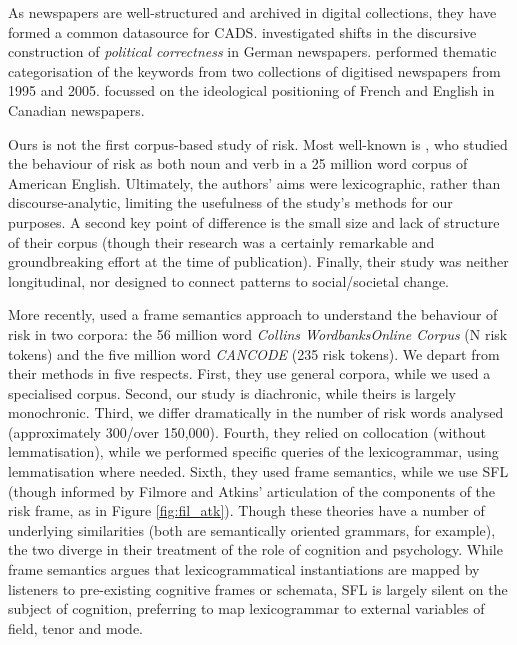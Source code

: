 \noindent As newspapers are well-structured and archived in digital collections, they have formed a common datasource for CADS.  investigated shifts in the discursive construction of \emph{political correctness} in German newspapers.  performed thematic categorisation of the keywords from two collections of digitised newspapers from 1995 and 2005.  focussed on the ideological positioning of French and English in Canadian newspapers. %

Ours is not the first corpus-based study of risk. Most well-known is , who studied the behaviour of risk as both noun and verb in a 25 million word corpus of American English. Ultimately, the authors' aims were lexicographic, rather than discourse-analytic, limiting the usefulness of the study's methods for our purposes. A second key point of difference is the small size and lack of structure of their corpus (though their research was a certainly remarkable and groundbreaking effort at the time of publication). Finally, their study was neither longitudinal, nor designed to connect patterns to social/societal change.

More recently,  used a frame semantics approach to understand the behaviour of risk in two corpora: the 56 million word \emph{Collins WordbanksOnline Corpus} (N risk tokens) and the five million word \emph{CANCODE} (235 risk tokens). 
We depart from their methods in five respects. First, they use general corpora, while we used a specialised corpus. Second, our study is diachronic, while theirs is largely monochronic. Third, we differ dramatically in the number of risk words analysed (approximately 300/over 150,000). Fourth, they relied on collocation (without lemmatisation), while we performed specific queries of the lexicogrammar, using lemmatisation where needed. Sixth, they used frame semantics, while we use SFL (though informed by Filmore and Atkins' \citeyear{fillmore_toward_1992} articulation of the components of the risk frame, as in Figure \ref{fig:fil_atk}). Though these theories have a number of underlying similarities (both are semantically oriented grammars, for example), the two diverge in their treatment of the role of cognition and psychology. While frame semantics argues that lexicogrammatical instantiations are mapped by listeners to pre-existing cognitive frames or schemata, SFL is largely silent on the subject of cognition, preferring to map lexicogrammar to external variables of field, tenor and mode.

